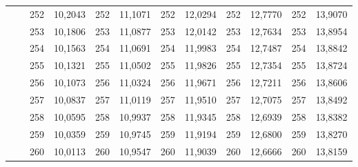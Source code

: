 \documentclass[a4paper,12pt]{article} %
\begin{document}
\begin{longtable}[c]{cccccccccc|c|c|}
	& \multicolumn{1}{c|}{} & \multicolumn{1}{c|}{252} & \multicolumn{1}{c|}{10,2043} & \multicolumn{1}{c|}{252} & \multicolumn{1}{c|}{11,1071} & \multicolumn{1}{c|}{252} & \multicolumn{1}{c|}{12,0294} & \multicolumn{1}{c|}{252} & 12,7770 & 252 & 13,9070 \\ \cline{3-12} 
	& \multicolumn{1}{c|}{} & \multicolumn{1}{c|}{253} & \multicolumn{1}{c|}{10,1806} & \multicolumn{1}{c|}{253} & \multicolumn{1}{c|}{11,0877} & \multicolumn{1}{c|}{253} & \multicolumn{1}{c|}{12,0142} & \multicolumn{1}{c|}{253} & 12,7634 & 253 & 13,8954 \\ \cline{3-12} 
	& \multicolumn{1}{c|}{} & \multicolumn{1}{c|}{254} & \multicolumn{1}{c|}{10,1563} & \multicolumn{1}{c|}{254} & \multicolumn{1}{c|}{11,0691} & \multicolumn{1}{c|}{254} & \multicolumn{1}{c|}{11,9983} & \multicolumn{1}{c|}{254} & 12,7487 & 254 & 13,8842 \\ \cline{3-12} 
	& \multicolumn{1}{c|}{} & \multicolumn{1}{c|}{255} & \multicolumn{1}{c|}{10,1321} & \multicolumn{1}{c|}{255} & \multicolumn{1}{c|}{11,0502} & \multicolumn{1}{c|}{255} & \multicolumn{1}{c|}{11,9826} & \multicolumn{1}{c|}{255} & 12,7354 & 255 & 13,8724 \\ \cline{3-12} 
	& \multicolumn{1}{c|}{} & \multicolumn{1}{c|}{256} & \multicolumn{1}{c|}{10,1073} & \multicolumn{1}{c|}{256} & \multicolumn{1}{c|}{11,0324} & \multicolumn{1}{c|}{256} & \multicolumn{1}{c|}{11,9671} & \multicolumn{1}{c|}{256} & 12,7211 & 256 & 13,8606 \\ \cline{3-12} 
	& \multicolumn{1}{c|}{} & \multicolumn{1}{c|}{257} & \multicolumn{1}{c|}{10,0837} & \multicolumn{1}{c|}{257} & \multicolumn{1}{c|}{11,0119} & \multicolumn{1}{c|}{257} & \multicolumn{1}{c|}{11,9510} & \multicolumn{1}{c|}{257} & 12,7075 & 257 & 13,8492 \\ \cline{3-12} 
	& \multicolumn{1}{c|}{} & \multicolumn{1}{c|}{258} & \multicolumn{1}{c|}{10,0595} & \multicolumn{1}{c|}{258} & \multicolumn{1}{c|}{10,9937} & \multicolumn{1}{c|}{258} & \multicolumn{1}{c|}{11,9345} & \multicolumn{1}{c|}{258} & 12,6939 & 258 & 13,8382 \\ \cline{3-12} 
	& \multicolumn{1}{c|}{} & \multicolumn{1}{c|}{259} & \multicolumn{1}{c|}{10,0359} & \multicolumn{1}{c|}{259} & \multicolumn{1}{c|}{10,9745} & \multicolumn{1}{c|}{259} & \multicolumn{1}{c|}{11,9194} & \multicolumn{1}{c|}{259} & 12,6800 & 259 & 13,8270 \\ \cline{3-12} 
	& \multicolumn{1}{c|}{} & \multicolumn{1}{c|}{260} & \multicolumn{1}{c|}{10,0113} & \multicolumn{1}{c|}{260} & \multicolumn{1}{c|}{10,9547} & \multicolumn{1}{c|}{260} & \multicolumn{1}{c|}{11,9039} & \multicolumn{1}{c|}{260} & 12,6666 & 260 & 13,8159 \\ \cline{3-12} 

\end{longtable}
\end{document}
